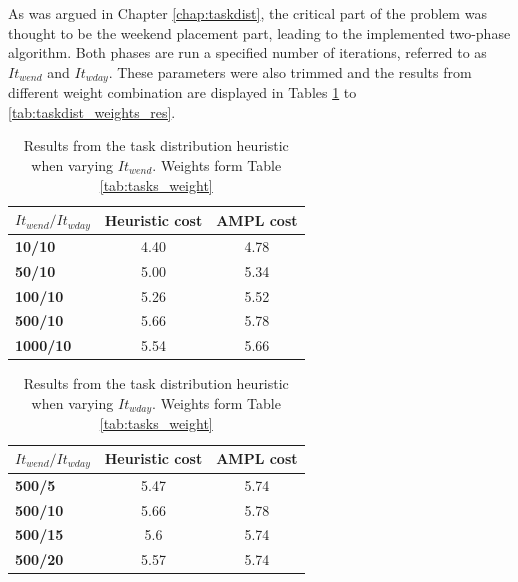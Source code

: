 As was argued in Chapter \ref{chap:taskdist}, the critical part of the problem was thought to be the weekend placement part, leading to the implemented two-phase algorithm. Both phases are run a specified number of iterations, referred to as $It_{wend}$ and $It_{wday}$. These parameters were also trimmed and the results from different weight combination are displayed in Tables \ref{tab:taskdist_res_wendit} to \ref{tab:taskdist_weights_res}. 

\begin{table}[!h]
\centering
\caption{Results from the task distribution heuristic when varying $It_{wend}$. Weights form Table \ref{tab:tasks_weight}}
\label{tab:taskdist_res_wendit}
\begin{tabular}{|l|l|l|}
\hline
\rowcolor{Gray} \textbf{$It_{wend}/It_{wday}$} &  \textbf{Heuristic cost} &  \textbf{AMPL cost} \\ \hline
\cellcolor{Gray} \textbf{10/10} & \multicolumn{1}{c|}{4.40} & \multicolumn{1}{c|}{4.78} \\
\cellcolor{Gray} \textbf{50/10} & \multicolumn{1}{c|}{5.00} & \multicolumn{1}{c|}{5.34} \\
\cellcolor{Gray} \textbf{100/10} & \multicolumn{1}{c|}{5.26} & \multicolumn{1}{c|}{5.52} \\
\cellcolor{Gray} \textbf{500/10} & \multicolumn{1}{c|}{5.66} & \multicolumn{1}{c|}{5.78} \\
\cellcolor{Gray} \textbf{1000/10} & \multicolumn{1}{c|}{5.54} & \multicolumn{1}{c|}{5.66}  \\
\hline
\end{tabular}
\end{table}

\begin{table}[!h]
\centering
\caption{Results from the task distribution heuristic when varying $It_{wday}$. Weights form Table \ref{tab:tasks_weight}}
\label{tab:taskdist_res_wdayit}
\begin{tabular}{|l|l|l|}
\hline
\rowcolor{Gray} \textbf{$It_{wend}/It_{wday}$} &  \textbf{Heuristic cost} &  \textbf{AMPL cost} \\ \hline
\cellcolor{Gray} \textbf{500/5} & \multicolumn{1}{c|}{5.47} & \multicolumn{1}{c|}{5.74} \\
\cellcolor{Gray} \textbf{500/10} & \multicolumn{1}{c|}{5.66} & \multicolumn{1}{c|}{5.78} \\
\cellcolor{Gray} \textbf{500/15} & \multicolumn{1}{c|}{5.6} & \multicolumn{1}{c|}{5.74} \\
\cellcolor{Gray} \textbf{500/20} & \multicolumn{1}{c|}{5.57} & \multicolumn{1}{c|}{5.74} \\
\hline
\end{tabular}
\end{table}


